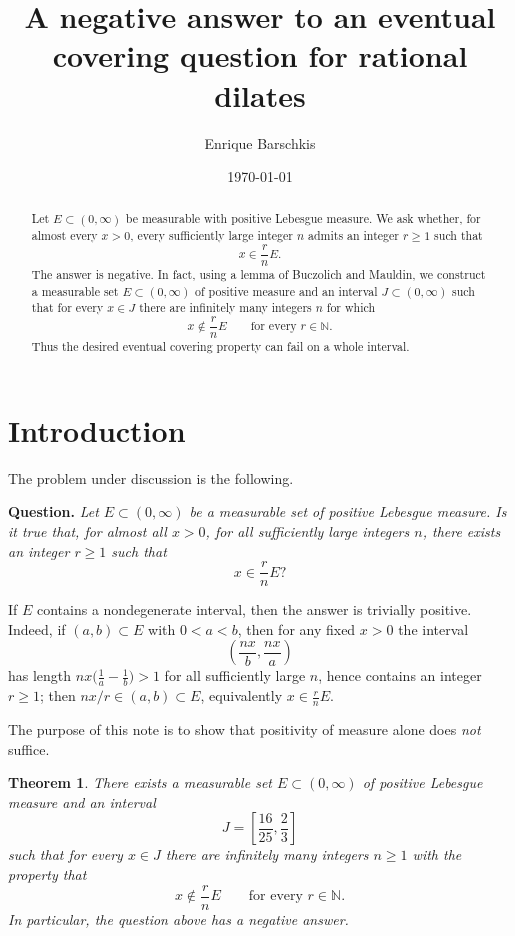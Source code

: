 \documentclass[11pt]{article}
\title{A negative answer to an eventual covering question for rational dilates}
\author{Enrique Barschkis}
\date{\today}
\newtheorem{theorem}{Theorem}
\theoremstyle{remark}
\newcommand{\N}{\mathbb{N}}
\begin{document}
\maketitle

\begin{abstract}
  Let $E\subset (0,\infty)$ be measurable with positive Lebesgue measure. We ask whether, for almost every $x>0$, every sufficiently large integer $n$ admits an integer $r\ge 1$ such that
  \[
    x\in \frac{r}{n}E.
  \]
  The answer is negative. In fact, using a lemma of Buczolich and Mauldin, we construct a measurable set $E\subset (0,\infty)$ of positive measure and an interval $J\subset (0,\infty)$ such that for every $x\in J$ there are infinitely many integers $n$ for which
  \[
    x\notin \frac{r}{n}E\qquad\text{for every }r\in \N.
  \]
  Thus the desired eventual covering property can fail on a whole interval.
\end{abstract}

\section{Introduction}

The problem under discussion is the following.

\medskip
\noindent
\textbf{Question.}
\emph{Let $E\subset (0,\infty)$ be a measurable set of positive Lebesgue measure. Is it true that, for almost all $x>0$, for all sufficiently large integers $n$, there exists an integer $r\ge 1$ such that}
\[
  x\in \frac{r}{n}E?
\]
\medskip

If $E$ contains a nondegenerate interval, then the answer is trivially positive. Indeed, if $(a,b)\subset E$ with $0<a<b$, then for any fixed $x>0$ the interval
\[
  \left(\frac{nx}{b},\frac{nx}{a}\right)
\]
has length $nx\bigl(\frac1a-\frac1b\bigr)>1$ for all sufficiently large $n$, hence contains an integer $r\ge 1$; then $nx/r\in (a,b)\subset E$, equivalently $x\in \frac{r}{n}E$.

The purpose of this note is to show that positivity of measure alone does \emph{not} suffice.

\begin{theorem}\label{thm:main}
  There exists a measurable set $E\subset (0,\infty)$ of positive Lebesgue measure and an interval
  \[
    J=\left[\frac{16}{25},\frac23\right]
  \]
  such that for every $x\in J$ there are infinitely many integers $n\ge 1$ with the property that
  \[
    x\notin \frac{r}{n}E\qquad\text{for every }r\in \N.
  \]
  In particular, the question above has a negative answer.
\end{theorem}
\end{document}

